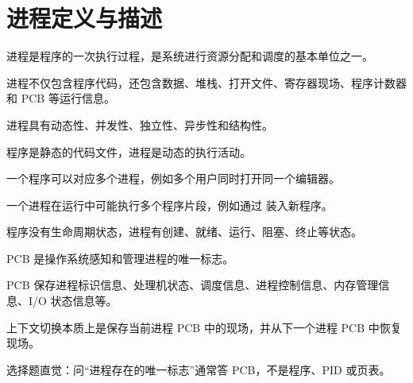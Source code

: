 \section{进程定义与描述}
\begin{points}
  \item 进程是程序的一次执行过程，是系统进行资源分配和调度的基本单位之一。
  \item 进程不仅包含程序代码，还包含数据、堆栈、打开文件、寄存器现场、程序计数器和 PCB 等运行信息。
  \item 进程具有动态性、并发性、独立性、异步性和结构性。
\end{points}


\begin{points}
  \item 程序是静态的代码文件，进程是动态的执行活动。
  \item 一个程序可以对应多个进程，例如多个用户同时打开同一个编辑器。
  \item 一个进程在运行中可能执行多个程序片段，例如通过  装入新程序。
  \item 程序没有生命周期状态，进程有创建、就绪、运行、阻塞、终止等状态。
\end{points}


\begin{points}
  \item PCB 是操作系统感知和管理进程的唯一标志。
  \item PCB 保存进程标识信息、处理机状态、调度信息、进程控制信息、内存管理信息、I/O 状态信息等。
  \item 上下文切换本质上是保存当前进程 PCB 中的现场，并从下一个进程 PCB 中恢复现场。
  \item 选择题直觉：问“进程存在的唯一标志”通常答 PCB，不是程序、PID 或页表。
\end{points}



